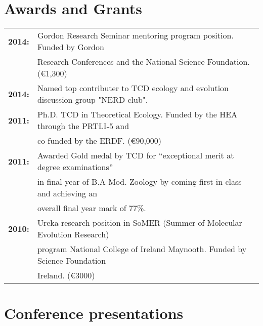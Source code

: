 \documentclass[10pt,a4paper]{article}
\begin{document}

\section{Awards and Grants}

\begin{tabular}{ll}
\textbf{2014:} & Gordon Research Seminar mentoring program position. Funded by Gordon\\
& Research Conferences and the National Science Foundation. (\euro 1,300)\\
\textbf{2014:} & Named top contributer to TCD ecology and evolution discussion group "NERD club".\\
\textbf{2011:} & Ph.D. TCD in Theoretical Ecology. Funded by the HEA through the PRTLI-5 and\\
& co-funded by the ERDF. (\euro 90,000)\\
\textbf{2011:} & Awarded Gold medal by TCD for “exceptional merit at degree examinations”\\
& in final year of B.A Mod. Zoology by coming first in class and achieving an\\
& overall final year mark of 77\%.\\
\textbf{2010:} & Ureka research position in SoMER (Summer of Molecular Evolution Research) \\
& program National College of Ireland Maynooth.  Funded by Science Foundation\\
& Ireland. (\euro 3000)\\ 
\end{tabular}

\bigskip



\section{Conference presentations}
\end{document}

